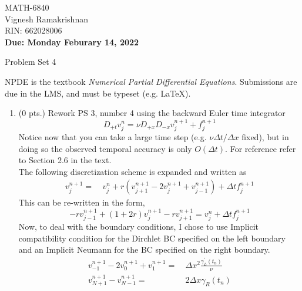 \documentclass[11pt]{article}
\newcommand{\Dpt}{D_{+t}}
\newcommand{\Dpx}{D_{+x}}
\newcommand{\Dmx}{D_{-x}}
\newcommand{\dx}{\Delta x}
\newcommand{\dt}{\Delta t}
\newcommand{\vnj}{v^{n}_j}
\newcommand{\vnpj}{v^{n+1}_j}
\newcommand{\vnpjp}{v^{n+1}_{j+1}}
\newcommand{\vnpjm}{v^{n+1}_{j-1}}
\newcommand{\vnpz}{v^{n+1}_{0}}
\newcommand{\vnpzm}{v^{n+1}_{-1}}
\newcommand{\vnpNp}{v^{n+1}_{N+1}}
\begin{document}
\begin{flushright}
\small{MATH-6840\\
Vignesh Ramakrishnan\\
RIN: 662028006 \\
{\bf Due: Monday Feburary 14, 2022}}
\end{flushright}

\begin{center}
\large{Problem Set 4}\\
\end{center}

NPDE is the textbook {\em Numerical Partial Differential Equations}. Submissions are due in the LMS, and must be typeset (e.g. \LaTeX).

\begin{enumerate}
  \item (0 pts.) {\color{red}Rework PS 3, number 4 using the backward Euler time integrator}
    \[
      \Dpt v_j^n = \nu\Dpx\Dmx v_j^{n+1}+f_j^{n+1}
    \]
    {\color{red}Notice now that you can take a large time step (e.g. }$\nu\Delta t/\Delta x$ {\color{red}fixed), but in doing so the observed temporal accuracy is only} $O(\Delta t)${\color{red}. For reference refer to Section 2.6 in the text.} \\
    
    The following discretization scheme is expanded and written as
    \begin{align*}
    \vnpj = & \ \vnj + r\left(\vnpjp -2\vnpj + \vnpjm \right) + \dt f^{n+1}_{j} 
    \end{align*}
    This can be re-written in the form,
    \[
    -r\vnpjm + \left(1+2r\right)\vnpj -r\vnpjp = \vnj + \dt f^{n+1}_j
    \]
    Now, to deal with the boundary conditions, I chose to use Implicit compatibility condition for the Dirchlet BC specified on the left boundary and an Implicit Neumann for the BC specified on the right boundary. 
    \begin{align*}
    \vnpzm - 2\vnpz + v^{n+1}_1 = & \ \dx^2\frac{\gamma^{'}_L(t_n)}{\nu} \\
    \vnpNp - v^{n+1}_{N-1} = & \ 2\dx\gamma_R(t_n)
    \end{align*}
     
     

\end{enumerate}
\end{document}
